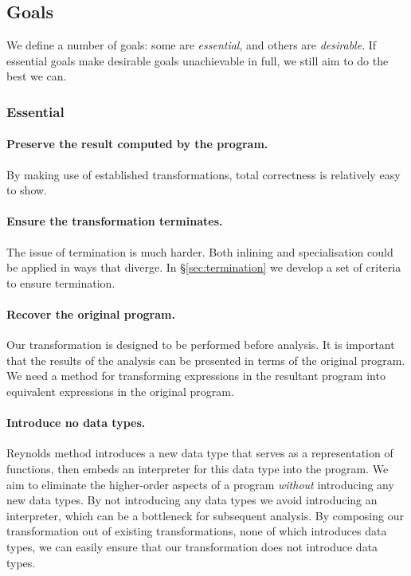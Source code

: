 \documentclass[preprint]{sigplanconf}
\begin{document}
\subsection{Goals}
\label{sec:goals}

We define a number of goals: some are \textit{essential}, and others are \textit{desirable}. If essential goals make desirable goals unachievable in full, we still aim to do the best we can.

\subsubsection*{Essential}

\paragraph{Preserve the result computed by the program.} By making use of established transformations, total correctness is relatively easy to show.

\paragraph{Ensure the transformation terminates.} The issue of termination is much harder. Both inlining and specialisation could be applied in ways that diverge. In \S\ref{sec:termination} we develop a set of criteria to ensure termination.

\paragraph{Recover the original program.} Our transformation is designed to be performed before analysis. It is important that the results of the analysis can be presented in terms of the original program. We need a method for transforming expressions in the resultant program into equivalent expressions in the original program.

\paragraph{Introduce no data types.} Reynolds method introduces a new data type that serves as a representation of functions, then embeds an interpreter for this data type into the program. We aim to eliminate the higher-order aspects of a program \textit{without} introducing any new data types. By not introducing any data types we avoid introducing an interpreter, which can be a bottleneck for subsequent analysis. By composing our transformation out of existing transformations, none of which introduces data types, we can easily ensure that our transformation does not introduce data types.
\end{document}
